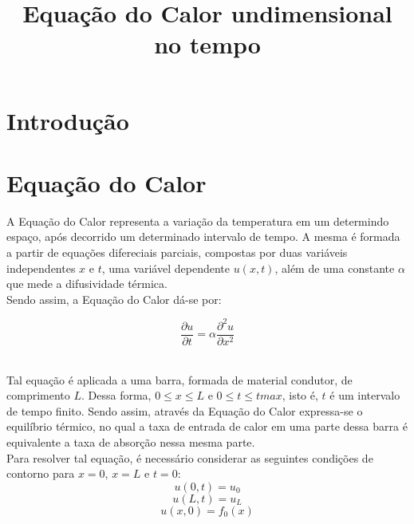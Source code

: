 \documentclass[a4paper,11pt]{article}
\title{Equação do Calor undimensional no tempo}
\begin{document}
\maketitle

\author{
}

\vspace{8mm}





\section{Introdução}


\section{Equação do Calor}
A Equação do Calor representa a variação da temperatura em um determindo espaço, após decorrido um determinado intervalo de tempo. A mesma é formada a partir de equações difereciais parciais, compostas por duas variáveis independentes $x$ e $t$, uma variável dependente $u(x,t)$, além de uma constante $\alpha$ que mede a difusividade térmica. \\ \indent Sendo assim, a Equação do Calor dá-se por: 

$$\dfrac{\partial u}{\partial t}= \alpha \dfrac{\partial^2 u}{\partial x^2}$$

\\ \indent Tal equação é aplicada a uma barra, formada de material condutor, de comprimento $L$. Dessa forma, $0 \leq x \leq L$ e $0 \leq t \leq tmax$, isto é, $t$ é um intervalo de tempo finito. Sendo assim, através da Equação do Calor expressa-se o equilíbrio  térmico, no qual a taxa de entrada de calor em uma parte dessa barra é equivalente a taxa de absorção nessa mesma parte. \\
\indent Para resolver tal equação, é necessário considerar as seguintes condições de contorno para $x=0$, $x=L$ e $t=0$:
$$u(0,t)=u_0$$ $$u(L,t)=u_L$$ $$u(x,0)=f_0(x)$$
\end{document}
